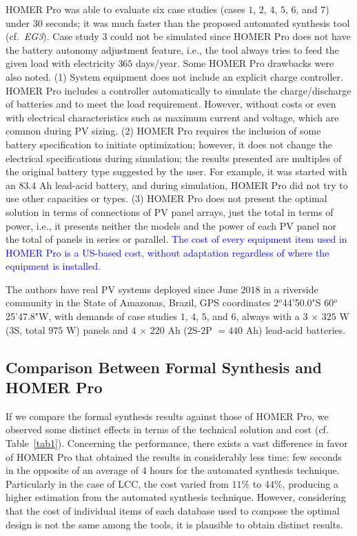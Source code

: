 \documentclass[runningheads]{llncs}
\begin{document}
HOMER Pro was able to evaluate six case studies (cases $1$, $2$, $4$, $5$, $6$, and $7$) under $30$ seconds; it was much faster than the proposed automated synthesis tool (cf.~\textit{EG3}). Case study $3$ could not be simulated since HOMER Pro does not have the battery autonomy adjustment feature, i.e., the tool always tries to feed the given load with electricity $365$ days/year. Some HOMER Pro drawbacks were also noted. (1) System equipment does not include an explicit charge controller. HOMER Pro includes a controller automatically to simulate the charge/discharge of batteries and to meet the load requirement. However, without costs or even with electrical characteristics such as maximum current and voltage, which are common during PV sizing. (2) HOMER Pro requires the inclusion of some battery specification to initiate optimization; however, it does not change the electrical specifications during simulation; the results presented are multiples of the original battery type suggested by the user. For example, it was started with an $83.4$ Ah lead-acid battery, and during simulation, HOMER Pro did not try to use other capacities or types. (3) HOMER Pro does not present the optimal solution in terms of connections of PV panel arrays, just the total in terms of power, i.e., it presents neither the models and the power of each PV panel nor the total of panels in series or parallel. \textcolor{blue}{The cost of every equipment item used in HOMER Pro is a US-based cost, without adaptation regardless of where the equipment is installed.}

The authors have real PV systems deployed since June $2018$ in a riverside community in the State of Amazonas, Brazil, GPS coordinates 2$^{o}$44'50.0"S 60$^{o}$25'47.8"W, with demands of case studies $1$, $4$, $5$, and $6$, always with a $3$ $\times$ $325$ W ($3$S, total $975$ W) panels and $4$ $\times$ $220$ Ah ($2$S-$2$P $= 440$ Ah) lead-acid batteries.

\subsection{Comparison Between Formal Synthesis and HOMER Pro}

If we compare the formal synthesis results against those of HOMER Pro, we observed some distinct effects in terms of the technical solution and cost (cf. Table~\ref{tab1}). Concerning the performance, there exists a vast difference in favor of HOMER Pro that obtained the results in considerably less time: few seconds in the opposite of an average of $4$ hours for the automated synthesis technique. Particularly in the case of LCC, the cost varied from $11$\% to $44$\%, producing a higher estimation from the automated synthesis technique. However, considering that the cost of individual items of each database used to compose the optimal design is not the same among the tools, it is plausible to obtain distinct results.
\end{document}
